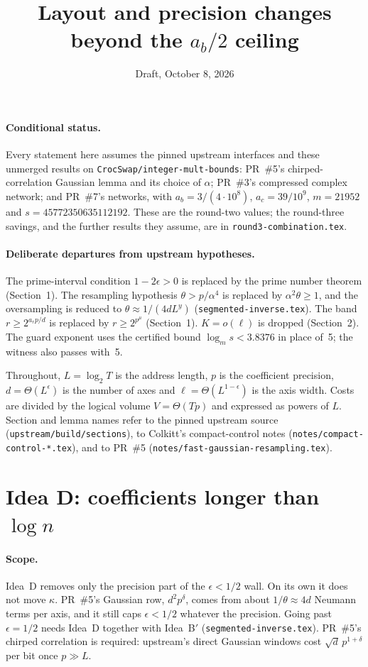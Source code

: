 \documentclass[11pt]{article}
\title{Layout and precision changes beyond the $a_b/2$ ceiling}
\date{Draft, October 8, 2026}
\theoremstyle{remark}\newtheorem*{remark}{Remark}
\begin{document}
\maketitle

\paragraph{Conditional status.} Every statement here assumes the pinned upstream interfaces and these unmerged results on \texttt{CrocSwap/integer-mult-bounds}: PR~\#5's chirped-correlation Gaussian lemma and its choice of $\alpha$; PR~\#3's compressed complex network; and PR~\#7's networks, with $a_b=3/(4\cdot10^8)$, $a_c=39/10^9$, $m=21952$ and $s=45772350635112192$. These are the round-two values; the round-three savings, and the further results they assume, are in \texttt{round3-combination.tex}.

\paragraph{Deliberate departures from upstream hypotheses.} The prime-interval condition $1-2\epsilon>0$ is replaced by the prime number theorem (Section~1). The resampling hypothesis $\theta>p/\alpha^4$ is replaced by $\alpha^2\theta\ge1$, and the oversampling is reduced to $\theta\approx1/(4dL^y)$ (\texttt{segmented-inverse.tex}). The band $r\ge2^{a_rp/d}$ is replaced by $r\ge2^{p^\mu}$ (Section~1). $K=o(\ell)$ is dropped (Section~2). The guard exponent uses the certified bound $\log_ms<3.8376$ in place of~5; the witness also passes with~5.

Throughout, $L=\log_2T$ is the address length, $p$ is the coefficient precision,
$d=\Theta(L^\epsilon)$ is the number of axes and $\ell=\Theta(L^{1-\epsilon})$ is the axis
width. Costs are divided by the logical volume $V=\Theta(Tp)$ and expressed as powers
of $L$. Section and lemma names refer to the pinned upstream source
(\texttt{upstream/build/sections}), to Colkitt's compact-control notes
(\texttt{notes/compact-control-*.tex}), and to PR~\#5 (\texttt{notes/fast-gaussian-resampling.tex}).

\section{Idea D: coefficients longer than $\log n$}

\paragraph{Scope.} Idea~D removes only the precision part of the $\epsilon<1/2$ wall. On its own it does not move $\kappa$. PR~\#5's Gaussian row, $d^2p^\delta$, comes from about $1/\theta\approx4d$ Neumann terms per axis, and it still caps $\epsilon<1/2$ whatever the precision. Going past $\epsilon=1/2$ needs Idea~D together with Idea~B$'$ (\texttt{segmented-inverse.tex}). PR~\#5's chirped correlation is required: upstream's direct Gaussian windows cost $\sqrt d\,p^{1+\delta}$ per bit once $p\gg L$.
\end{document}
